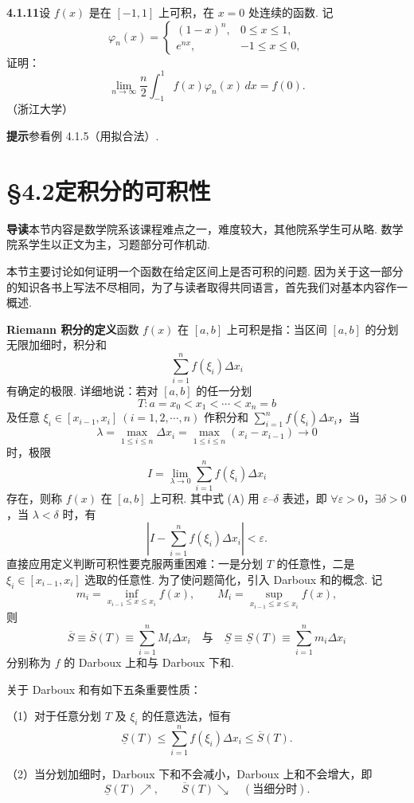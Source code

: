 \documentclass[UTF8, 12pt, fontset=fandol, oneside]{ctexart}
\begin{document}
\noindent\textbf{4.1.11}\quad 设 $f(x)$ 是在 $[-1,1]$ 上可积，在 $x=0$ 处连续的函数. 记
\[
\varphi_n(x)=
\begin{cases}
(1-x)^n, & 0\le x\le1,\\
e^{nx}, & -1\le x\le0,
\end{cases}
\]
证明：
\[
\lim_{n\to\infty}\frac n2\int_{-1}^1f(x)\varphi_n(x)\,dx=f(0).
\]
（浙江大学）

\noindent\textbf{提示}\quad 参看例 4.1.5（用拟合法）.

\section*{§4.2\quad 定积分的可积性}

\noindent\textbf{导读}\quad 本节内容是数学院系该课程难点之一，难度较大，其他院系学生可从略. 数学院系学生以正文为主，习题部分可作机动.

本节主要讨论如何证明一个函数在给定区间上是否可积的问题. 因为关于这一部分的知识各书上写法不尽相同，为了与读者取得共同语言，首先我们对基本内容作一概述.

\noindent\textbf{Riemann 积分的定义}\quad 函数 $f(x)$ 在 $[a,b]$ 上可积是指：当区间 $[a,b]$ 的分划无限加细时，积分和
\[
\sum_{i=1}^n f(\xi_i)\Delta x_i
\]
有确定的极限. 详细地说：若对 $[a,b]$ 的任一分划
\[
T:a=x_0<x_1<\cdots<x_n=b
\]
及任意 $\xi_i\in[x_{i-1},x_i]\ (i=1,2,\cdots,n)$ 作积分和 $\sum_{i=1}^n f(\xi_i)\Delta x_i$，当
\[
\lambda=\max_{1\le i\le n}\Delta x_i
=\max_{1\le i\le n}(x_i-x_{i-1})\to0
\]
时，极限
\[
I=\lim_{\lambda\to0}\sum_{i=1}^n f(\xi_i)\Delta x_i
\tag{A}
\]
存在，则称 $f(x)$ 在 $[a,b]$ 上可积. 其中式 (A) 用 $\varepsilon$--$\delta$ 表述，即 $\forall\varepsilon>0$，$\exists\delta>0$，当 $\lambda<\delta$ 时，有
\[
\left|I-\sum_{i=1}^n f(\xi_i)\Delta x_i\right|<\varepsilon.
\tag{B}
\]
直接应用定义判断可积性要克服两重困难：一是分划 $T$ 的任意性，二是 $\xi_i\in[x_{i-1},x_i]$ 选取的任意性. 为了使问题简化，引入 Darboux 和的概念. 记
\[
m_i=\inf_{x_{i-1}\le x\le x_i}f(x),\qquad
M_i=\sup_{x_{i-1}\le x\le x_i}f(x),
\]
则
\[
\overline S\equiv\overline S(T)\equiv\sum_{i=1}^nM_i\Delta x_i
\quad\text{与}\quad
\underline S\equiv\underline S(T)\equiv\sum_{i=1}^nm_i\Delta x_i
\]
分别称为 $f$ 的 Darboux 上和与 Darboux 下和.

关于 Darboux 和有如下五条重要性质：

（1）对于任意分划 $T$ 及 $\xi_i$ 的任意选法，恒有
\[
\underline S(T)\le\sum_{i=1}^n f(\xi_i)\Delta x_i\le\overline S(T).
\]

（2）当分划加细时，Darboux 下和不会减小，Darboux 上和不会增大，即
\[
\underline S(T)\nearrow,\qquad \overline S(T)\searrow\quad(\text{当细分时}).
\]
\end{document}
